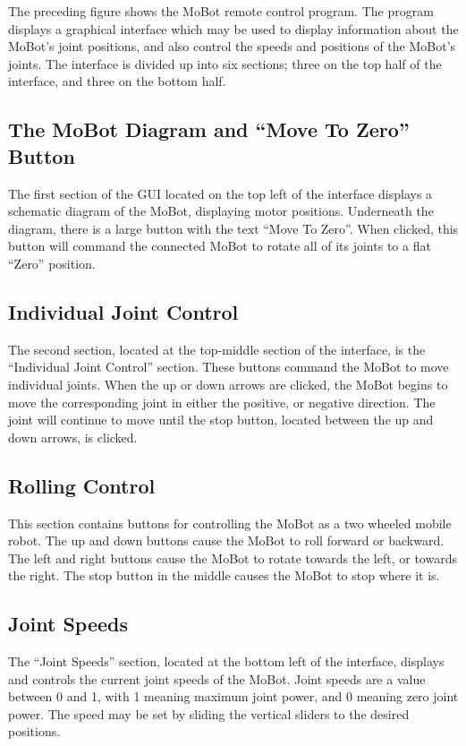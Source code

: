 \documentclass{article}
\begin{document}
The preceding figure shows the MoBot remote control program. The
program displays a graphical interface which may be used to display
information about the MoBot's joint positions, and also control the
speeds and positions of the MoBot's joints. The interface is divided
up into six sections; three on the top half of the interface, and three on 
the bottom half. 

\subsection{The MoBot Diagram and ``Move To Zero'' Button}
The first section of the GUI located on the top left of the interface
displays a schematic diagram of the MoBot, displaying motor positions.
Underneath the diagram, there is a large button with the text 
``Move To Zero''. When clicked, this button will command the connected
MoBot to rotate all of its joints to a flat ``Zero'' position.

\subsection{Individual Joint Control}
The second section, located at the top-middle section of the interface,
is the ``Individual Joint Control'' section. These buttons command the
MoBot to move individual joints. When the up or down arrows are clicked,
the MoBot begins to move the corresponding joint in either the positive,
or negative direction. The joint will continue to move until the stop 
button, located between the up and down arrows, is clicked. 

\subsection{Rolling Control}
This section contains buttons for controlling the MoBot as a 
two wheeled mobile robot. The up and down buttons cause the MoBot to
roll forward or backward. The left and right buttons cause the MoBot 
to rotate towards the left, or towards the right. The stop button in the
middle causes the MoBot to stop where it is.

\subsection{Joint Speeds}
The ``Joint Speeds'' section, located at the bottom left of the interface,
displays and controls the current joint speeds of the MoBot. Joint speeds
are a value between 0 and 1, with 1 meaning maximum joint power, and 0
meaning zero joint power. The speed may be set by sliding the vertical 
sliders to the desired positions. 
\end{document}
